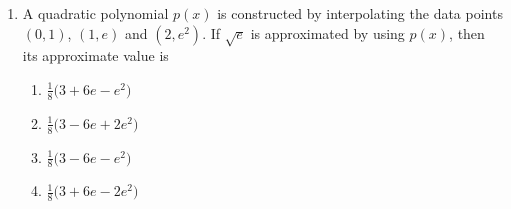 \documentclass[journal,12pt,onecolumn]{IEEEtran}
\theoremstyle{remark}
\begin{document}
\begin{enumerate}
\item A quadratic polynomial $p(x)$ is constructed by interpolating the data points $(0, 1)$, $(1, e)$ and $(2, e^2)$. If $\sqrt{e}$ is approximated by using $p(x)$, then its approximate value is  
\\[-0.3em]\makebox[\textwidth][r]{\textit{[GATE EE 2025]}}

\begin{multicols}{2}
\begin{enumerate}[label=(\Alph*)]
\item $\frac{1}{8} \big( 3 + 6e - e^2 \big)$
\item $\frac{1}{8} \big( 3 - 6e + 2e^2 \big)$
\item $\frac{1}{8} \big( 3 - 6e - e^2 \big)$
\item $\frac{1}{8} \big( 3 + 6e - 2e^2 \big)$
\end{enumerate}
\end{multicols}

\end{enumerate}
\end{document}
